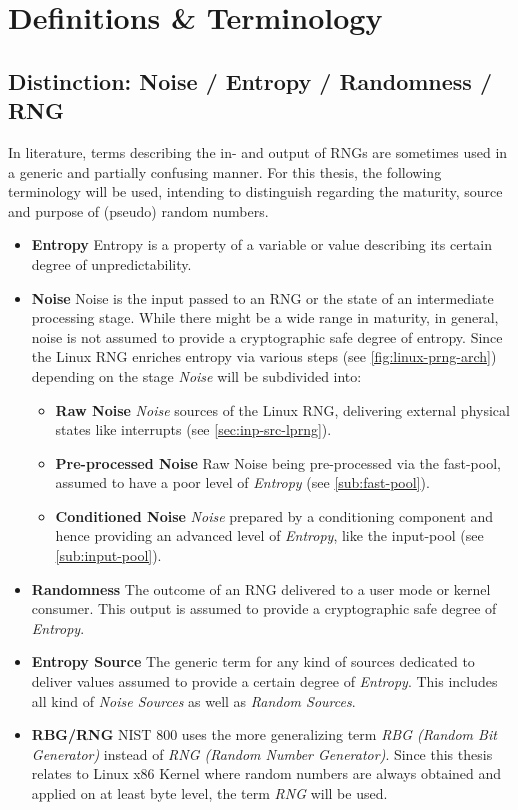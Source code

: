 \section{Definitions \& Terminology}

\subsection{Distinction: Noise / Entropy / Randomness / RNG}
In literature, terms describing the in- and output of RNGs are sometimes used in a generic and partially confusing manner. For this thesis, the following terminology will be used, intending to distinguish regarding the maturity, source and purpose of (pseudo) random numbers.

\begin{itemize}
	\item \textbf{Entropy} Entropy is a property of a variable or value describing its certain degree of unpredictability. 
	\item \textbf{Noise} Noise is the input passed to an RNG or the state of an intermediate processing stage.
	While there might be a wide range in maturity, in general, noise is not assumed to provide a cryptographic safe degree of entropy. Since the Linux RNG enriches entropy via various steps (see \ref{fig:linux-prng-arch}) depending on the stage \textit{Noise} will be subdivided into:
	\begin{itemize}
		\item \textbf{Raw Noise} \textit{Noise} sources of the Linux RNG, delivering external physical states like interrupts (see \ref{sec:inp-src-lprng}).
		\item \textbf{Pre-processed Noise} Raw Noise being pre-processed via the fast-pool, assumed to have a poor level of \textit{Entropy} (see \ref{sub:fast-pool}).
		\item \textbf{Conditioned Noise} \textit{Noise} prepared by a conditioning component and hence providing an advanced level of \textit{Entropy}, like the input-pool (see \ref{sub:input-pool}).	
	\end{itemize}
	\item \textbf{Randomness} The outcome of an RNG delivered to a user mode or kernel consumer. This output is assumed to provide a cryptographic safe degree of \textit{Entropy}.
	\item \textbf{Entropy Source} The generic term for any kind of sources dedicated to deliver values assumed to provide a certain degree of \textit{Entropy}. This includes all kind of \textit{Noise Sources} as well as \textit{Random Sources}.	
	\item \textbf{RBG/RNG} NIST 800 uses the more generalizing term \textit{RBG (Random Bit Generator)} instead of \textit{RNG (Random Number Generator)}. Since this thesis relates to Linux x86 Kernel where random numbers are always obtained and applied on at least byte level, the term \textit{RNG} will be used.
\end{itemize}

